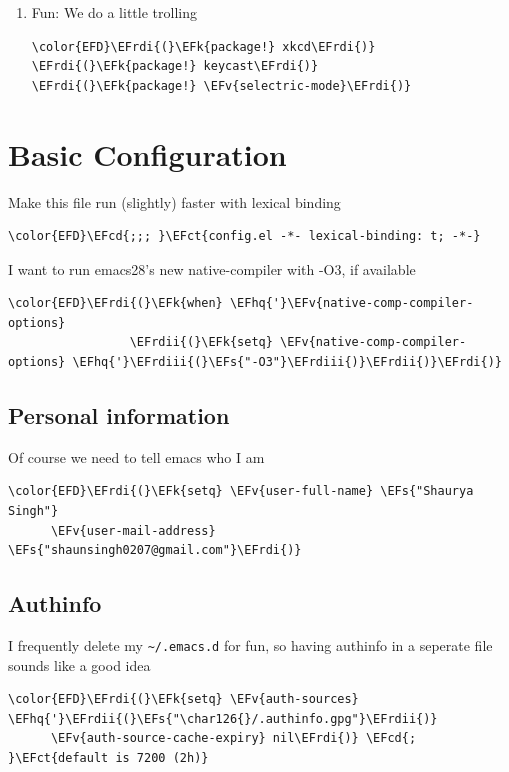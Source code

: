 \documentclass{scrartcl}
\newcommand{\EFk}[1]{\textcolor{EFk}{#1}} %
\newcommand{\EFs}[1]{\textcolor{EFs}{#1}} %
\newcommand{\EFct}[1]{\textcolor{EFct}{#1}} %
\newcommand{\EFv}[1]{\textcolor{EFv}{#1}} %
\newcommand{\EFcd}[1]{\textcolor{EFcd}{#1}} %
\newcommand{\EFhq}[1]{#1} %
\newcommand{\EFrdi}[1]{#1} %
\newcommand{\EFrdii}[1]{#1} %
\newcommand{\EFrdiii}[1]{#1} %
\begin{document}
\begin{enumerate}
\item Fun:
\label{sec:orgba495b6}
We do a little trolling
\begin{Code}
\begin{Verbatim}[]
\color{EFD}\EFrdi{(}\EFk{package!} xkcd\EFrdi{)}
\EFrdi{(}\EFk{package!} keycast\EFrdi{)}
\EFrdi{(}\EFk{package!} \EFv{selectric-mode}\EFrdi{)}
\end{Verbatim}
\end{Code}
\end{enumerate}

\section{Basic Configuration}
\label{sec:org008a852}
Make this file run (slightly) faster with lexical binding
\begin{Code}
\begin{Verbatim}[]
\color{EFD}\EFcd{;;; }\EFct{config.el -*- lexical-binding: t; -*-}
\end{Verbatim}
\end{Code}

I want to run emacs28's new native-compiler with -O3, if available
\begin{Code}
\begin{Verbatim}[]
\color{EFD}\EFrdi{(}\EFk{when} \EFhq{'}\EFv{native-comp-compiler-options}
                 \EFrdii{(}\EFk{setq} \EFv{native-comp-compiler-options} \EFhq{'}\EFrdiii{(}\EFs{"-O3"}\EFrdiii{)}\EFrdii{)}\EFrdi{)}
\end{Verbatim}
\end{Code}

\subsection{Personal information}
\label{sec:org9578bae}
Of course we need to tell emacs who I am
\begin{Code}
\begin{Verbatim}[]
\color{EFD}\EFrdi{(}\EFk{setq} \EFv{user-full-name} \EFs{"Shaurya Singh"}
      \EFv{user-mail-address} \EFs{"shaunsingh0207@gmail.com"}\EFrdi{)}
\end{Verbatim}
\end{Code}

\subsection{Authinfo}
\label{sec:org465e92d}
I frequently delete my \texttt{\textasciitilde{}/.emacs.d} for fun, so having authinfo in a seperate file
sounds like a good idea
\begin{Code}
\begin{Verbatim}[]
\color{EFD}\EFrdi{(}\EFk{setq} \EFv{auth-sources} \EFhq{'}\EFrdii{(}\EFs{"\char126{}/.authinfo.gpg"}\EFrdii{)}
      \EFv{auth-source-cache-expiry} nil\EFrdi{)} \EFcd{; }\EFct{default is 7200 (2h)}
\end{Verbatim}
\end{Code}
\end{document}
